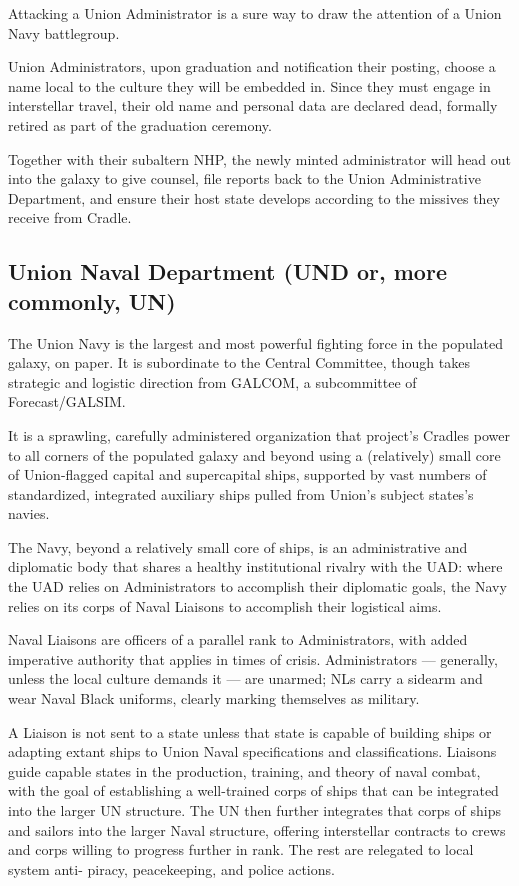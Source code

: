 Attacking a Union Administrator is a sure way to draw the attention of a Union Navy battlegroup.

Union Administrators, upon graduation and notification their posting, choose a name local to the
culture they will be embedded in. Since they must engage in interstellar travel, their old name
and personal data are declared dead, formally retired as part of the graduation ceremony.

Together with their subaltern NHP, the newly minted administrator will head out into the galaxy to
give counsel, file reports back to the Union Administrative Department, and ensure their host
state develops according to the missives they receive from Cradle.

\subsection{Union Naval Department (UND or, more commonly, UN)}

The Union Navy is the largest and most powerful fighting force in the populated galaxy, on paper.
It is subordinate to the Central Committee, though takes strategic and logistic direction from
GALCOM, a subcommittee of Forecast/GALSIM.

It is a sprawling, carefully administered organization that project's Cradles power to all corners of
the populated galaxy and beyond using a (relatively) small core of Union-flagged capital and
supercapital ships, supported by vast numbers of standardized, integrated auxiliary ships pulled
from Union's subject states's navies.

The Navy, beyond a relatively small core of ships, is an administrative and diplomatic body that
shares a healthy institutional rivalry with the UAD: where the UAD relies on Administrators to
accomplish their diplomatic goals, the Navy relies on its corps of Naval Liaisons to accomplish
their logistical aims.

Naval Liaisons are officers of a parallel rank to Administrators, with added imperative authority
that applies in times of crisis. Administrators — generally, unless the local culture demands it —
are unarmed; NLs carry a sidearm and wear Naval Black uniforms, clearly marking themselves as
military.

A Liaison is not sent to a state unless that state is capable of building ships or adapting extant
ships to Union Naval specifications and classifications. Liaisons guide capable states in the
production, training, and theory of naval combat, with the goal of establishing a well-trained
corps of ships that can be integrated into the larger UN structure. The UN then further integrates
that corps of ships and sailors into the larger Naval structure, offering interstellar contracts to
crews and corps willing to progress further in rank. The rest are relegated to local system anti-
piracy, peacekeeping, and police actions.

